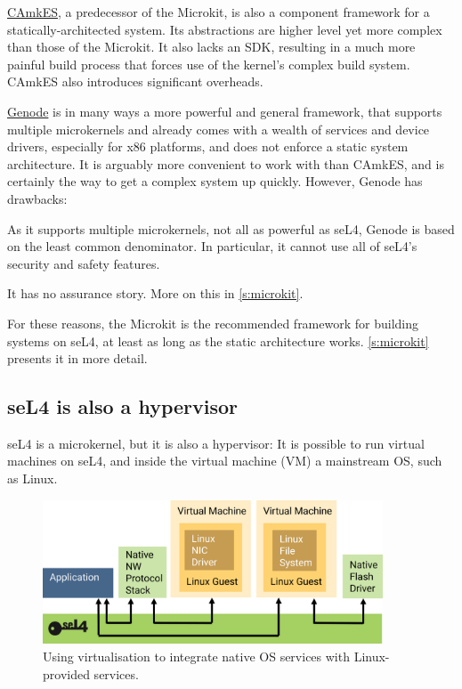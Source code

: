 \documentclass[english,a4paper,12pt]{report}
\newcommand{\SSect}[1]{\subsection{#1}}
\newcommand{\SSect}[1]{\section{#1}}
\begin{document}
  \href{https://trustworthy.systems/projects/OLD/camkes/}{CAmkES},
  a predecessor of the Microkit, is also a component
  framework for a statically-architected system. Its abstractions are
  higher level yet more complex than those of the Microkit. It also
  lacks an SDK, resulting in a much more painful build process that
  forces use of the kernel's complex build system. CAmkES also
  introduces significant overheads.

  \href{https://genode.org/}{Genode} is in many ways a more powerful
  and general framework, that supports multiple microkernels and
  already comes with a wealth of services and device drivers,
  especially for x86 platforms, and does not enforce a static system
  architecture. It is arguably more convenient
  to work with than CAmkES, and is certainly the way to get a
  complex system up quickly. However, Genode has drawbacks:
  \begin{inparaenum}
  \item As it supports multiple microkernels, not all as powerful as
    seL4, Genode is based on the least common denominator. In
    particular, it cannot use all of seL4's security and safety
    features.
  \item It has no assurance story. More on this in \autoref{s:microkit}.
  \end{inparaenum}

  For these reasons, the Microkit is the recommended framework for
  building systems on seL4, at least as long as the static
  architecture works. \autoref{s:microkit} presents it in more detail.

  \SSect{seL4 is also a hypervisor}\label{s:hyp}

  seL4 is a microkernel, but it is also a hypervisor: It is possible
  to run virtual machines on seL4, and inside the virtual machine (VM)
  a mainstream OS, such as Linux.

  \begin{figure}[ht]
    \centering
    \includegraphics[width=0.9\textwidth]{hypervisor}
    \caption[VM-provided services]{Using virtualisation to integrate
      native OS services with Linux-provided services.}
    \label{f:vms}
  \end{figure}
\end{document}
